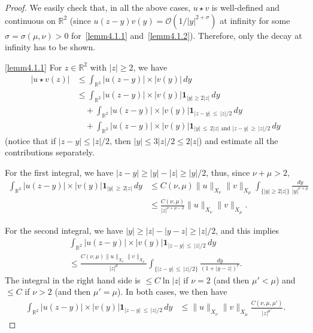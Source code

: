 \documentclass[AHL,Unicode,longabstracts,published]{cedram}
\newcommand*\R{\mathbb R}
\newcommand*\BO{\mathcal{O}}
\newcommand{\bfun}{\mathbf{1}}
\newcommand*\gs{\geqslant }
\newcommand*\ls{\leqslant }
\newcommand*\s{\sigma}
\begin{document}
\begin{proof}
We easily check that, in all the above cases, $ u \star v $ is well-defined and continuous on $ \R^2 $ (since $ u(z -y) v(y) = \BO(1/|y|^{2+\s}) $ at infinity for some $ \s = \s(\mu,\nu)> 0 $ for~\eqref{lemm4.1.1} and~\eqref{lemm4.1.2}). Therefore, only the decay at infinity has to be shown.

\noindent\eqref{lemm4.1.1} For $ z \in \R^2 $ with $ |z| \gs 2 $, we have
\begin{align*}
\lvert u \star v (z) \rvert & \ls \int_{\R^2} \lvert u (z-y) \rvert \times \lvert v (y) \rvert \, dy
\\
& \ls
\int_{\R^2} \lvert u (z-y) \rvert \times \lvert v(y) \rvert \bfun_{|y| \gs 2 |z| } \, dy
\\
& \quad + \int_{\R^2} \lvert u (z-y) \rvert \times \lvert v(y) \rvert \bfun_{ |z-y|\,\ls\,|z|/2 } \, dy
\\
& \quad + \int_{\R^2} \lvert u (z-y) \rvert \times \lvert v(y) \rvert \bfun_{|y|\,\ls\,2 |z| \text{ and } |z-y|\,\gs\,|z| /2 } \, dy
\end{align*}
(notice that if $ |z-y| \ls |z|/2 $, then $ |y| \ls 3|z|/2 \ls 2 |z| $) and estimate all the contributions separately.

For the first integral, we have $ |z-y| \gs |y| - |z| \gs |y|/2 $, thus, since $ \nu + \mu > 2 $,
\begin{align*}
\int_{\R^2} \lvert u (z -y) \rvert \times \lvert v(y) \rvert \bfun_{|y|\,\gs\,2 |z| } \, dy & \ls C(\nu, \mu) \| u \|_{X_{\nu}} \| v \|_{X_{\mu}} \int_{ \{ |y| \gs 2 |z| \} } \frac{dy}{|y|^{\nu +\mu}}
\\
& \ls \frac{C(\nu, \mu)}{ |z|^{\nu + \mu - 2 } } \| u \|_{X_{\nu}} \| v \|_{X_{\mu}}.
\end{align*}

For the second integral, we have $|y| \gs |z| - |y-z| \gs |z| /2 $, and this implies
\begin{multline*}
\int_{\R^2} \lvert u (z-y) \rvert \times \lvert v(y) \rvert \bfun_{ |z-y|\,\ls\,|z|/2 } \, dy \\ \ls \frac{C (\nu, \mu) \| u \|_{X_{\nu}} \| v \|_{ X_{\mu}} }{ |z|^{\mu} }
\int_{ \{ |z-y|\,\ls\,|z|/2 \} } \frac{dy}{ (1 + |y-z|)^\nu }.
\end{multline*}
The integral in the right hand side is $ \ls C \ln |z| $ if $ \nu = 2 $ (and then $ \mu ' < \mu $) and $ \ls C $ if $ \nu > 2 $ (and then $ \mu' = \mu $). In both cases, we then have
\begin{align*}
\int_{\R^2} \lvert u (z-y) \rvert \times \lvert v(y) \rvert \bfun_{ |z-y|\,\ls\,|z|/2 } \, dy & \ls \| u \|_{X_{\nu}} \| v \|_{X_{\mu}}
\frac{ C (\nu, \mu,\mu')}{ |z|^{\mu'} }.
\end{align*}


\end{proof}
\end{document}
